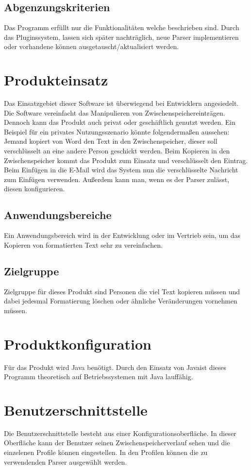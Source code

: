 \documentclass[a4paper,11pt,abstracton,titlepage]{scrartcl}
\begin{document}
\subsection{Abgenzungskriterien}
Das Programm erfüllt nur die Funktionalitäten welche beschrieben sind.  Durch
das Pluginssystem, lassen sich später nachträglich, neue Parser implementieren
oder vorhandene können ausgetauscht/aktualisiert werden.  

\section{Produkteinsatz}
Das Einsatzgebiet dieser Software ist überwiegend bei Entwicklern angesiedelt.
Die Software vereinfacht das Manipulieren von Zwischenspeichereinträgen. Dennoch
kann das Produkt auch privat oder geschäftlich genutzt werden.  Ein Beispiel für
ein privates Nutzungsszenario könnte folgendermaßen aussehen: Jemand kopiert von
Word den Text in den Zwischenspeicher, dieser soll verschlüsselt an eine andere
Person geschickt werden. Beim Kopieren in den Zwischenspeicher kommt das Produkt
zum Einsatz und verschlüsselt den Eintrag. Beim Einfügen in die E-Mail wird das
System nun die verschlüsselte Nachricht zum Einfügen verwenden. Außerdem kann
man, wenn es der Parser zulässt, diesen konfigurieren.

\subsection{Anwendungsbereiche}
Ein Anwendungsbereich wird in der Entwicklung oder im Vertrieb sein, um das
Kopieren von formatierten Text sehr zu vereinfachen.  

\subsection{Zielgruppe}
Zielgruppe für dieses Produkt sind Personen die viel Text kopieren müssen und
dabei jedesmal Formatierung löschen oder ähnliche Veränderungen vornehmen
müssen.  

\section{Produktkonfiguration}
Für das Produkt wird Java benötigt. Durch den Einsatz von
Java\texttrademark  ist dieses Programm theoretisch auf Betriebssystemen mit
Java lauffähig.  

\section{Benutzerschnittstelle}
Die Benutzerschnittstelle besteht aus einer Konfigurationsoberfläche.  In dieser
Oberfläche kann der Benutzer seinen Zwischenspeicherverlauf sehen und die
einzelenen Profile können eingestellen. In den Profilen können die zu
verwendenden Parser ausgewählt werden. 
\end{document}
